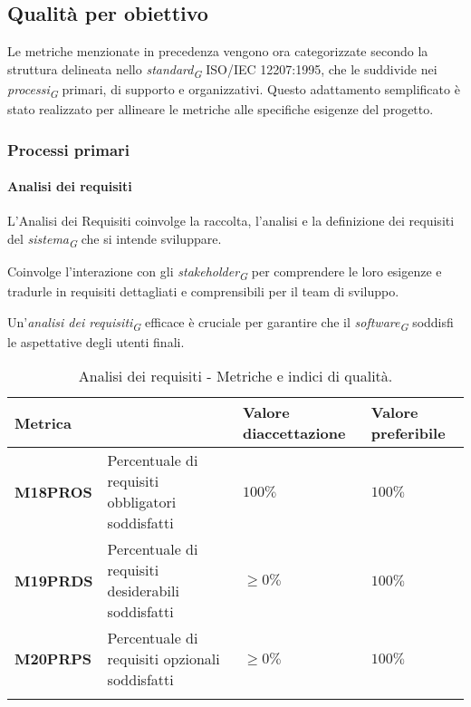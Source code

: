 \subsection{Qualità per obiettivo}
Le metriche menzionate in precedenza vengono ora categorizzate secondo la struttura delineata nello \textit{standard}\textsubscript{\textit{G}} ISO/IEC 12207:1995, che le suddivide nei \textit{processi}\textsubscript{\textit{G}} primari, di supporto e organizzativi. Questo adattamento semplificato è stato realizzato per allineare le metriche alle specifiche esigenze del progetto.

\subsubsection{Processi primari}
\paragraph{Analisi dei requisiti}
L'Analisi dei Requisiti coinvolge la raccolta, l'analisi e la definizione dei requisiti del \textit{sistema}\textsubscript{\textit{G}} che si intende sviluppare.

Coinvolge l'interazione con gli \textit{stakeholder}\textsubscript{\textit{G}} per comprendere le loro esigenze e tradurle in requisiti dettagliati e comprensibili per il team di sviluppo.

Un'\textit{analisi dei requisiti}\textsubscript{\textit{G}} efficace è cruciale per garantire che il \textit{software}\textsubscript{\textit{G}} soddisfi le aspettative degli utenti finali.

\vspace{0.4cm}

\begin{longtable}{|C{1.9cm}|L{4cm}|L{2.2cm}|L{2.1cm}|}
    \hline
    \textbf{Metrica} &  & \textbf{Valore di\linebreak accettazione} & {\textbf{Valore \linebreak preferibile}} \\
    \hline \hline
    
    \textbf{M18PROS} & Percentuale di requisiti obbligatori soddisfatti & $ 100\%$  & $ 100\%$ \\
    \hline

    \textbf{M19PRDS} & Percentuale di requisiti desiderabili soddisfatti & $\geq 0\%$ & $100\%$ \\
    \hline

    \textbf{M20PRPS} & Percentuale di requisiti opzionali soddisfatti & $\geq 0\%$ & $100\%$ \\
    \hline

    \caption{Analisi dei requisiti - Metriche e indici di qualità.}
    \label{tab:analisi_requisiti_progetto}
\end{longtable}

